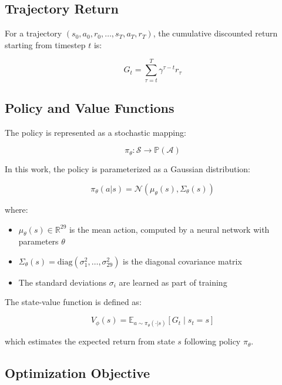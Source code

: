 \documentclass[12pt,a4paper]{article}
\begin{document}
\begin{itemize}
\begin{itemize}
\subsection{Trajectory Return}

For a trajectory $(s_0, a_0, r_0, \ldots, s_T, a_T, r_T)$, the cumulative discounted return starting from timestep $t$ is:

\begin{equation}
G_t = \sum_{\tau=t}^{T} \gamma^{\tau - t} r_\tau
\end{equation}

\subsection{Policy and Value Functions}

The policy is represented as a stochastic mapping:

\begin{equation}
\pi_\theta: \mathcal{S} \to \mathbb{P}(\mathcal{A})
\end{equation}

In this work, the policy is parameterized as a Gaussian distribution:

\begin{equation}
\pi_\theta(a | s) = \mathcal{N}(\mu_\theta(s), \Sigma_\theta(s))
\end{equation}

where:
\begin{itemize}
\item $\mu_\theta(s) \in \mathbb{R}^{29}$ is the mean action, computed by a neural network with parameters $\theta$
\item $\Sigma_\theta(s) = \text{diag}(\sigma_1^2, \ldots, \sigma_{29}^2)$ is the diagonal covariance matrix
\item The standard deviations $\sigma_i$ are learned as part of training
\end{itemize}

The state-value function is defined as:

\begin{equation}
V_\phi(s) = \mathbb{E}_{a \sim \pi_\theta(\cdot | s)} \left[ G_t \mid s_t = s \right]
\end{equation}

which estimates the expected return from state $s$ following policy $\pi_\theta$.

\subsection{Optimization Objective}


\end{itemize}
\end{itemize}
\end{document}
